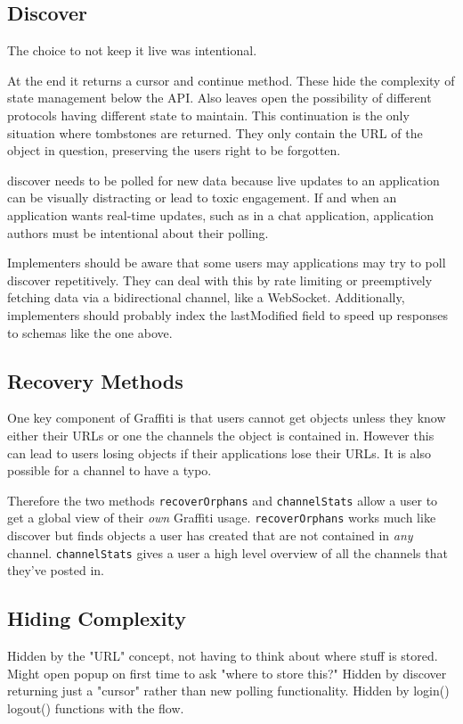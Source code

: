 \subsection{Discover}

The choice to not keep it live was intentional.

At the end it returns a cursor and continue method.
These hide the complexity of state management below the API.
Also leaves open the possibility of different protocols having different state to maintain.
This continuation is the only situation where tombstones are returned.
They only contain the URL of the object in question, preserving the users right to be forgotten.

discover needs to be polled for new data because live updates to an application can be visually distracting or lead to toxic engagement. If and when an application wants real-time updates, such as in a chat application, application authors must be intentional about their polling.

Implementers should be aware that some users may applications may try to poll discover repetitively. They can deal with this by rate limiting or preemptively fetching data via a bidirectional channel, like a WebSocket. Additionally, implementers should probably index the lastModified field to speed up responses to schemas like the one above.

\subsection{Recovery Methods}

One key component of Graffiti is that users cannot get objects
unless they know either their URLs or one the channels the object
is contained in.
However this can lead to users losing objects if their applications
lose their URLs. It is also possible for a channel to have a typo.

Therefore the two methods \texttt{recoverOrphans} and \texttt{channelStats}
allow a user to get a global view of their \emph{own} Graffiti usage.
\texttt{recoverOrphans} works much like discover but finds objects
a user has created that are not contained in \emph{any} channel.
\texttt{channelStats} gives a user a high level overview of all the
channels that they've posted in.

\subsection{Hiding Complexity}

Hidden by the "URL" concept, not having to think about where stuff is stored.
Might open popup on first time to ask "where to store this?"
Hidden by discover returning just a "cursor" rather than new polling functionality.
Hidden by login() logout() functions with the flow.
